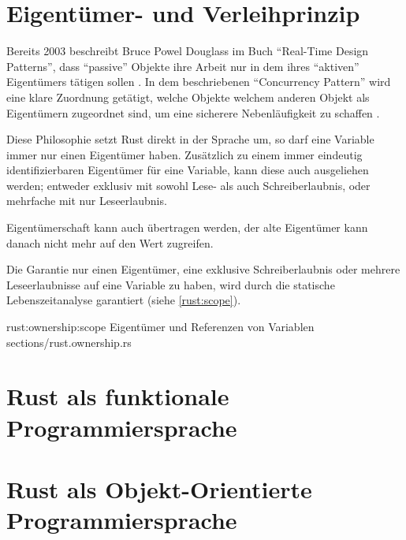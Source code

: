 

\section{Eigentümer- und Verleihprinzip}
\label{rust:ownership}

Bereits 2003 beschreibt Bruce Powel Douglass im Buch \enquote{Real-Time Design Patterns}, dass \enquote{passive} Objekte ihre Arbeit nur in dem  ihres \enquote{aktiven} Eigentümers tätigen sollen \cite[204]{douglass2003real}.
In dem beschriebenen \enquote{Concurrency Pattern} wird eine klare Zuordnung getätigt, welche Objekte welchem anderen Objekt als Eigentümern zugeordnet sind, um eine sicherere Nebenläufigkeit zu schaffen .

Diese Philosophie setzt Rust direkt in der Sprache um, so darf eine Variable immer nur einen Eigentümer haben. Zusätzlich zu einem immer eindeutig identifizierbaren Eigentümer für eine Variable, kann diese auch ausgeliehen werden; entweder exklusiv mit sowohl Lese- als auch Schreiberlaubnis, oder mehrfache mit nur Leseerlaubnis.

Eigentümerschaft kann auch übertragen werden, der alte Eigentümer kann danach nicht mehr auf den Wert zugreifen.

Die Garantie nur einen Eigentümer, eine exklusive Schreiberlaubnis oder mehrere Leseerlaubnisse auf eine Variable zu haben, wird durch die statische Lebenszeitanalyse garantiert (siehe \autoref{rust:scope}).

\rustcinclude
	{rust:ownership:scope}
	{Eigentümer und Referenzen von Variablen}
	{sections/rust.ownership.rs}




\section{Rust als funktionale Programmiersprache}

\section{Rust als Objekt-Orientierte Programmiersprache}



